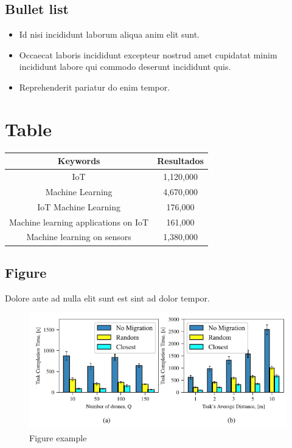 \documentclass[12pt]{article}
\begin{document}
\subsection{Bullet list}

\begin{itemize}
    \item Id nisi incididunt laborum aliqua anim elit sunt.
    \item Occaecat laboris incididunt excepteur nostrud amet cupidatat minim incididunt labore qui commodo deserunt incididunt quis.
    \item Reprehenderit pariatur do enim tempor.
\end{itemize}

\section{Table}

\begin{center}
    \begin{tabular}{ | c | c | }
    \hline
    Keywords & Resultados \\ 
    \hline
    IoT & 1,120,000 \\  
    \hline
    Machine Learning & 4,670,000 \\
    \hline
    IoT Machine Learning & 176,000 \\
    \hline
    Machine learning applications on IoT & 161,000 \\
    \hline
    Machine learning on sensors & 1,380,000 \\
    \hline
    \end{tabular}
\end{center}


\subsection{Figure}

\cite{analisis} Dolore aute ad nulla elit sunt est sint ad dolor tempor.

\begin{figure}[H]
    \centering
    \includegraphics[width=0.5\linewidth]{figure_1.png}
    \caption{Figure example}
\end{figure}

\nocite{*}
\medskip



\end{document}
